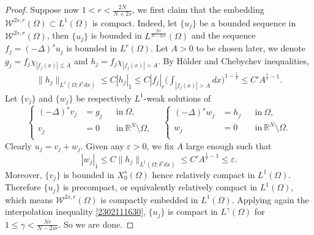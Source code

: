 \documentclass[10pt,a4paper]{amsart}
\begin{document}
\begin{proof}
Suppose now $1<r< \frac{2N}{N+2s}$, we first claim that the embedding $\mathcal{W}^{2s, r}(\Omega)\subset L^{1}(\Omega)$ is compact. Indeed, let $\{u_j\}$ be a bounded sequence in $\mathcal{W}^{2s, r}(\Omega)$, then $\{u_j\}$ is bounded in $L^{\frac{Nr}{N-2sr}}(\Omega)$ and the sequence $f_j = (-\Delta)^{s} u_j$ is bounded in $L^r(\Omega)$. Let $A > 0$ to be chosen later, we denote $g_j = f_j\chi_{|f_j(x)|\le A}$ and $h_j = f_j\chi_{|f_j(x)|> A}$. By H\"older and Chebychev inequalities,
\begin{align*}
\|h_j\|_{L^1(\Omega; \delta^s dx)} \leq C|h_j|_1\leq C|f_j|_r\Big(\int_{|f_j(x)|> A} dx\Big)^{1-\frac{1}{r}} \le C'A^{\frac{1}{r}-1}.
\end{align*}
Let $\{v_j\}$ and $\{w_j\}$ be respectively $L^1$-weak solutions of
\begin{equation}\label{2306010025}
\left\{
\begin{split}
(-\Delta)^{s} v_j &=g_j &&\text{in}~\Omega,\\
v_j&=0 &&\text{in} ~ \mathbb{R}^N\setminus\Omega,\\
\end{split}
\right. \quad \left\{
\begin{split}
(-\Delta)^{s} w_j&=h_j &&\text{in}~\Omega,\\
w_j&=0 &&\text{in} ~ \mathbb{R}^N\setminus\Omega.\\
\end{split}
\right.
\end{equation}
Clearly $u_j=v_j+w_j$. Given any $\varepsilon>0$, we fix $A$ large enough such that 
\[
|w_j|_1\le C\|h_j\|_{L^1(\Omega; \delta^s dx)} \le C'A^{\frac{1}{r}-1} \le \varepsilon.
\]
Moreover, $\{v_j\}$ is bounded in $X_0^s(\Omega)$ hence relatively compact in $L^1(\Omega)$. Therefore $\{u_j\}$ is precompact, or equivalently relatively compact in $L^1(\Omega)$, which means $\mathcal{W}^{2s, r}(\Omega)$ is compactly embedded in $L^{1}(\Omega)$. Applying again the interpolation inequality \eqref{2302111630}, $\{u_j\}$ is compact in $L^\gamma(\Omega)$ for $1\le\gamma<\frac{Nr}{N-2sr}$. So we are done.
\end{proof}
\end{document}
